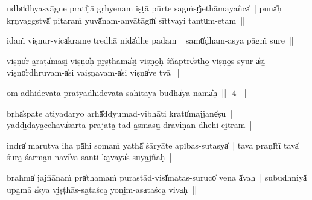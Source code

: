 \documentclass[parskip, DIV=14]{scrartcl}
\begin{document}
{%

udbu̍dhyasvāgne̱ prati̍jā gṛhyenam iṣṭā pū̱rte sagṁsṛ̍jethāma̱yañca̍~| puna̍ḥ kṛ̱ṇvaggstvā̍ pi̱tara̱ṁ yuvā̍nam-a̱nvātāgṁ̍ sī̱ttvayi̱ tantu̍m-e̱tam~||


i̱daṁ viṣṇu̱r-vica̍krame tre̱dhā nida̍dhe pa̱dam~| samū̍ḍham-asya pāgṁ su̱re~||


viṣṇo̍r-a̱rāṭa̍masi̱ viṣṇo̎ḥ pṛ̱ṣṭhama̍si̱ viṣṇo̱ḥ śñaptre̎stho̱ viṣṇo̱s-syūr-a̍si̱ viṣṇo̎rdhru̱vam-a̍si vaiṣṇa̱vam-a̍si̱ viṣṇa̍ve tvā~||


om adhidevatā pratyadhidevatā sahitāya budhā̍ya॒ nama̍ḥ~||~\,4\,~||
\vspace{0.5cm}

bṛha̍spate̱ ati̱yada̱ryo arhā̎ddyu̱mad-vi̱bhāti̱ kratu̍ma̱jjane̍ṣu~| yaddī̱daya̱cchava̍sarta prajāta̱ tad-a̱smāsu̱ dravi̍ṇan dhehi ci̱tram~||


indra̍ marutva i̱ha pā̍hi̱ soma̱ṁ yathā̍ śāryā̱te api̍bas-su̱tasya̍~| tava̱ praṇī̍tī̱ tava̍ śūra̱-śarma̱n-nāvi̍vā santi ka̱vaya̍s-suya̱jñāḥ~||


brahma̍ jajñā̱naṁ pra̍tha̱maṁ pu̱rastā̱d-visī̍ma̱tas-su̱ruco̍ ve̱na ā̍vaḥ~| subu̱dhniyā̍ upa̱mā a̍sya vi̱ṣṭhās-sa̱taśca̱ yoni̱m-asa̍taśca̱ viva̍ḥ~||

}
\end{document}
